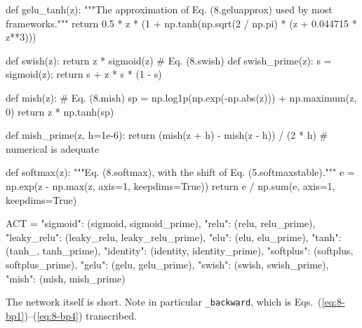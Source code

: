 \begin{Python}{}
def gelu_tanh(z):
    """The approximation of Eq. (8.geluapprox) used by most frameworks."""
    return 0.5 * z * (1 + np.tanh(np.sqrt(2 / np.pi) * (z + 0.044715 * z**3)))

def swish(z):          return z * sigmoid(z)               # Eq. (8.swish)
def swish_prime(z):
    s = sigmoid(z); return s + z * s * (1 - s)

def mish(z):                                               # Eq. (8.mish)
    sp = np.log1p(np.exp(-np.abs(z))) + np.maximum(z, 0)
    return z * np.tanh(sp)

def mish_prime(z, h=1e-6):
    return (mish(z + h) - mish(z - h)) / (2 * h)           # numerical is adequate

def softmax(z):
    """Eq. (8.softmax), with the shift of Eq. (5.softmaxstable)."""
    e = np.exp(z - np.max(z, axis=1, keepdims=True))
    return e / np.sum(e, axis=1, keepdims=True)

ACT = {"sigmoid": (sigmoid, sigmoid_prime), "relu": (relu, relu_prime),
       "leaky_relu": (leaky_relu, leaky_relu_prime), "elu": (elu, elu_prime),
       "tanh": (tanh_, tanh_prime), "identity": (identity, identity_prime),
       "softplus": (softplus, softplus_prime), "gelu": (gelu, gelu_prime),
       "swish": (swish, swish_prime), "mish": (mish, mish_prime)}
\end{Python}

The network itself is short.  Note in particular \texttt{\_backward}, which is
Eqs.~(\ref{eq:8-bp1})--(\ref{eq:8-bp4}) transcribed.

